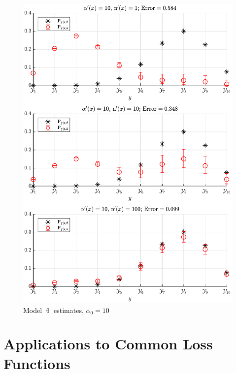 \documentclass[12pt]{report}
\begin{document}
\begin{figure}
\centering
\includegraphics[width=0.9\linewidth]{P_yx_error_a0_10.pdf}
\caption{Model $\uptheta$ estimates, $\alpha_0 = 10$}
\label{fig:P_yx_error_a0_10}
\end{figure}























\newpage



\section{Applications to Common Loss Functions}
\end{document}
